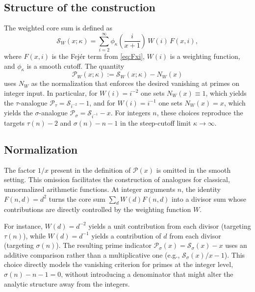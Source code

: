 \documentclass[11pt,a4paper]{amsart}
\theoremstyle{plain}
\theoremstyle{definition}
\theoremstyle{remark}
\begin{document}
\subsection{Structure of the construction}
The weighted core sum is defined as
\[ \mathcal{S}_W(x; \kappa) = \sum_{i=2}^{\infty} \phi_{\kappa}\!\left(\frac{i}{x+1}\right) \, W(i) \, F(x,i), \]
where $F(x,i)$ is the Fejér term from \eqref{eq:Fxi}, $W(i)$ is a weighting function, and $\phi_{\kappa}$ is a smooth cutoff. The quantity
\[ \mathcal{P}_W(x; \kappa) := \mathcal{S}_W(x; \kappa) - N_W(x) \]
uses $N_W$ as the normalization that enforces the desired vanishing at primes on integer input. In particular, for $W(i)=i^{-2}$ one sets $N_W(x)\equiv 1$, which yields the $\tau$-analogue $\mathcal P_\tau=\mathcal S_{i^{-2}}-1$, and for $W(i)=i^{-1}$ one sets $N_W(x)=x$, which yields the $\sigma$-analogue $\mathcal P_\sigma=\mathcal S_{i^{-1}}-x$. For integers $n$, these choices reproduce the targets $\tau(n)-2$ and $\sigma(n)-n-1$ in the steep-cutoff limit $\kappa\to\infty$.

\subsection{Normalization}
The factor $1/x$ present in the definition of $\mathcal{P}(x)$ is omitted in the smooth setting. This omission facilitates the construction of analogues for classical, unnormalized arithmetic functions. At integer arguments $n$, the identity $F(n,d)=d^2$ turns the core sum $\sum_d W(d)F(n,d)$ into a divisor sum whose contributions are directly controlled by the weighting function $W$.

For instance, $W(d)=d^{-2}$ yields a unit contribution from each divisor (targeting $\tau(n)$), while $W(d)=d^{-1}$ yields a contribution of $d$ from each divisor (targeting $\sigma(n)$). The resulting prime indicator $\mathcal{P}_\sigma(x) = \mathcal{S}_\sigma(x) - x$ uses an additive comparison rather than a multiplicative one (e.g., $\mathcal{S}_\sigma(x)/x - 1$). This choice directly models the vanishing criterion for primes at the integer level, $\sigma(n)-n-1=0$, without introducing a denominator that might alter the analytic structure away from the integers.
\end{document}
